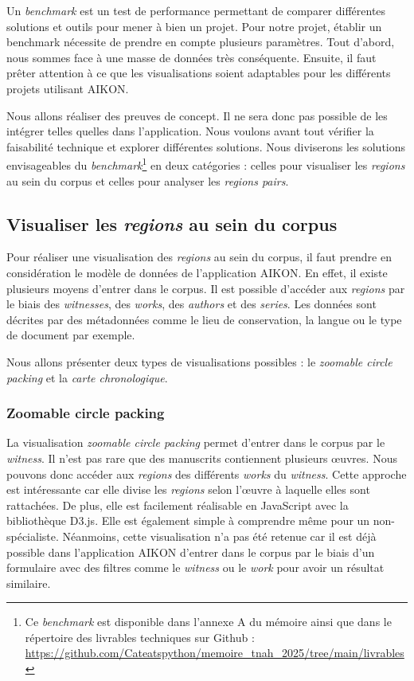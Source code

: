 Un \textit{benchmark} est un test de performance permettant de comparer différentes solutions et outils pour mener à bien un projet. Pour notre projet, établir un benchmark nécessite de prendre en compte plusieurs paramètres. Tout d'abord, nous sommes face à une masse de données très conséquente. Ensuite, il faut prêter attention à ce que les visualisations soient adaptables pour les différents projets utilisant AIKON. 

Nous allons réaliser des preuves de concept. Il ne sera donc pas possible de les intégrer telles quelles dans l'application. Nous voulons avant tout vérifier la faisabilité technique et explorer différentes solutions. Nous diviserons les solutions envisageables du \textit{benchmark}\footnote{Ce \textit{benchmark} est disponible dans l'annexe A du mémoire ainsi que dans le répertoire des livrables techniques sur Github : \url{https://github.com/Cateatspython/memoire_tnah_2025/tree/main/livrables}} en deux catégories : celles pour visualiser les \textit{regions} au sein du corpus et celles pour analyser les \textit{regions pairs}.

\subsection{Visualiser les \textit{regions} au sein du corpus}

Pour réaliser une visualisation des \textit{regions} au sein du corpus, il faut prendre en considération le modèle de données de l'application AIKON. En effet, il existe plusieurs moyens d'entrer dans le corpus. Il est possible d'accéder aux \textit{regions} par le biais des \textit{witnesses}, des \textit{works}, des \textit{authors} et des \textit{series}. Les données sont décrites par des métadonnées comme le lieu de conservation, la langue ou le type de document par exemple.

Nous allons présenter deux types de visualisations possibles : le \textit{zoomable circle packing} et la \textit{carte chronologique}.

\subsubsection{Zoomable circle packing}

La visualisation \textit{zoomable circle packing} permet d'entrer dans le corpus par le \textit{witness}. Il n'est pas rare que des manuscrits contiennent plusieurs œuvres. Nous pouvons donc accéder aux \textit{regions} des différents \textit{works} du \textit{witness}. Cette approche est intéressante car elle divise les \textit{regions} selon l'œuvre à laquelle elles sont rattachées. De plus, elle est facilement réalisable en JavaScript avec la bibliothèque D3.js. Elle est également simple à comprendre même pour un non-spécialiste. Néanmoins, cette visualisation n'a pas été retenue car il est déjà possible dans l'application AIKON d'entrer dans le corpus par le biais d'un formulaire avec des filtres comme le \textit{witness} ou le \textit{work} pour avoir un résultat similaire. 
	
